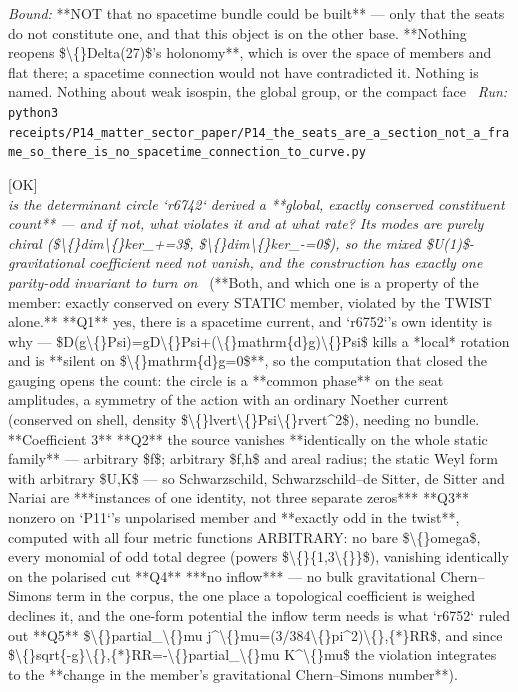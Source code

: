 \begin{description}
 \emph{Bound:}  **NOT that no spacetime bundle could be built** --- only that the seats do not constitute one, and that this object is on the other base. **Nothing reopens \$\textbackslash\{\}Delta(27)\$'s holonomy**, which is over the space of members and flat there; a spacetime connection would not have contradicted it. Nothing is named. Nothing about weak isospin, the global group, or the compact face
\ \emph{Run:} \texttt{python3 receipts/P14\_matter\_sector\_paper/P14\_the\_seats\_are\_a\_section\_not\_a\_frame\_so\_there\_is\_no\_spacetime\_connection\_to\_curve.py}
\item[\rcptlabel{P14_the_constituent_count_is_conserved_on_every_static_member_and_the_twist_alone_violates_it}{P14R93}\textbf{P14R93}\quad\texttt{P14\_the\_constituent\_count\_is\_conserved\_on\_every\_static\_member\_and\_the\_twist\_alone\_violates\_it}]\hfill\textsf{[OK]}\\
\textit{is the determinant circle `r6742` derived a **global, exactly conserved constituent count** --- and if not, what violates it and at what rate? Its modes are purely chiral (\$\textbackslash\{\}dim\textbackslash\{\}ker\_+=3\$, \$\textbackslash\{\}dim\textbackslash\{\}ker\_-=0\$), so the mixed \$U(1)\$-gravitational coefficient need not vanish, and the construction has exactly one parity-odd invariant to turn on} \ (**Both, and which one is a property of the member: exactly conserved on every STATIC member, violated by the TWIST alone.**  **Q1** yes, there is a spacetime current, and `r6752`'s own identity is why --- \$D(g\textbackslash\{\}Psi)=gD\textbackslash\{\}Psi+(\textbackslash\{\}mathrm\{d\}g)\textbackslash\{\}Psi\$ kills a *local* rotation and is **silent on \$\textbackslash\{\}mathrm\{d\}g=0\$**, so the computation that closed the gauging opens the count: the circle is a **common phase** on the seat amplitudes, a symmetry of the action with an ordinary Noether current (conserved on shell, density \$\textbackslash\{\}lvert\textbackslash\{\}Psi\textbackslash\{\}rvert\textasciicircum{}2\$), needing no bundle. **Coefficient 3**  **Q2** the source vanishes **identically on the whole static family** --- arbitrary \$f\$; arbitrary \$f,h\$ and areal radius; the static Weyl form with arbitrary \$U,K\$ --- so Schwarzschild, Schwarzschild--de Sitter, de Sitter and Nariai are ***instances of one identity, not three separate zeros***  **Q3** nonzero on `P11`'s unpolarised member and **exactly odd in the twist**, computed with all four metric functions ARBITRARY: no bare \$\textbackslash\{\}omega\$, every monomial of odd total degree (powers \$\textbackslash\{\}\{1,3\textbackslash\{\}\}\$), vanishing identically on the polarised cut  **Q4** ***no inflow*** --- no bulk gravitational Chern--Simons term in the corpus, the one place a topological coefficient is weighed declines it, and the one-form potential the inflow term needs is what `r6752` ruled out  **Q5** \$\textbackslash\{\}partial\_\textbackslash\{\}mu j\textasciicircum{}\textbackslash\{\}mu=(3/384\textbackslash\{\}pi\textasciicircum{}2)\textbackslash\{\},\{*\}RR\$, and since \$\textbackslash\{\}sqrt\{-g\}\textbackslash\{\},\{*\}RR=-\textbackslash\{\}partial\_\textbackslash\{\}mu K\textasciicircum{}\textbackslash\{\}mu\$ the violation integrates to the **change in the member's gravitational Chern--Simons number**). 

\end{description}
